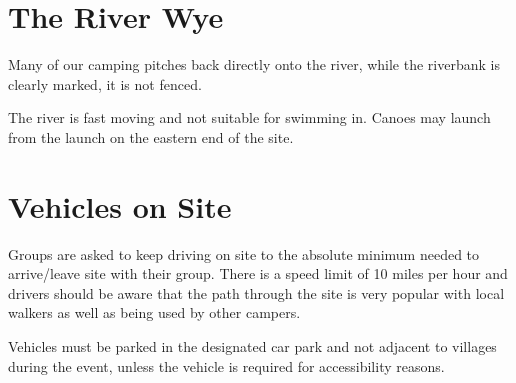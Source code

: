 \documentclass[a4paper, 11pt]{report}
\newcommand{\nl}{\newline}
\begin{document}
\section{The River Wye}
Many of our camping pitches back directly onto the river, while the riverbank is clearly marked, it is not fenced. \nl

The river is fast moving and not suitable for swimming in. Canoes may launch from the launch on the eastern end of the site.

\section{Vehicles on Site}
Groups are asked to keep driving on site to the absolute minimum needed to arrive/leave site with their group.  There is a speed limit of 10 miles per hour and drivers should be aware that the path through the site is very popular with local walkers as well as being used by other campers.\nl

Vehicles must be parked in the designated car park and not adjacent to villages during the event, unless the vehicle is required for accessibility reasons.


\backPage
\end{document}
